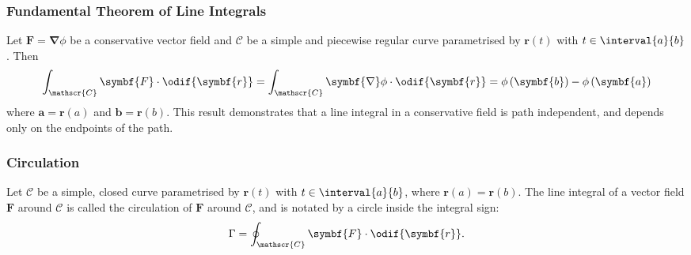 \documentclass{article}
\begin{document}
\subsubsection{Fundamental Theorem of Line Integrals}
Let \(\symbf{F} = \symbf{\nabla} \phi\) be a conservative vector field
and \(\mathscr{C}\) be a simple and piecewise regular curve
parametrised by \(\symbf{r}\left( t \right)\) with \(t \in
\interval{a}{b}\). Then
\begin{equation*}
    \int_{\mathscr{C}} \symbf{F} \cdot \odif{\symbf{r}} = \int_{\mathscr{C}} \symbf{\nabla} \phi \cdot \odif{\symbf{r}} = \phi\left( \symbf{b} \right) - \phi\left( \symbf{a} \right)
\end{equation*}
where \(\symbf{a} = \symbf{r}\left( a \right)\) and \(\symbf{b} = \symbf{r}\left( b \right)\).
This result demonstrates that a line integral in a conservative field
is path independent, and depends only on the endpoints of the path.
\subsubsection{Circulation}
Let \(\mathscr{C}\) be a simple, closed curve parametrised by
\(\symbf{r}\left( t \right)\) with \(t \in \interval{a}{b}\), where
\(\symbf{r}\left( a \right) = \symbf{r}\left( b \right)\). The line
integral of a vector field \(\symbf{F}\) around \(\mathscr{C}\) is
called the circulation of \(\symbf{F}\) around \(\mathscr{C}\), and is
notated by a circle inside the integral sign:
\begin{equation*}
    \Gamma = \oint_{\mathscr{C}} \symbf{F} \cdot \odif{\symbf{r}}.
\end{equation*}
\end{document}
